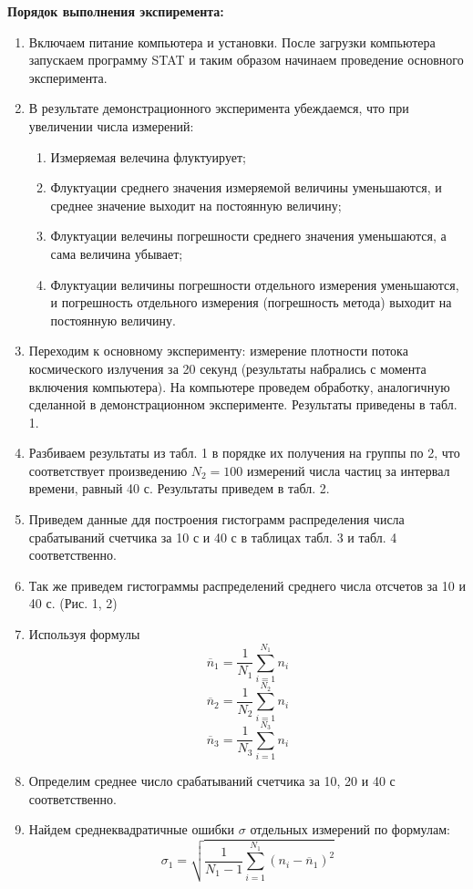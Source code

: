 \documentclass[a4paper, 12pt]{article}
\begin{document}
\textbf{Порядок выполнения экспиремента:}
\begin{enumerate}
\item Включаем питание компьютера и установки. После загрузки компьютера запускаем программу STAT и таким образом начинаем проведение основного эксперимента. 
\item В результате демонстрационного эксперимента убеждаемся, что при увеличении числа измерений:
\begin{enumerate}
\item Измеряемая велечина флуктуирует;
\item Флуктуации среднего значения измеряемой величины уменьшаются, и среднее значение выходит на постоянную величину;
\item Флуктуации велечины погрешности среднего значения уменьшаются, а сама величина убывает;
\item Флуктуации величины погрешности отдельного измерения уменьшаются, и погрешность отдельного измерения (погрешность метода) выходит на постоянную величину.
\end{enumerate}
\item Переходим к основному эксперименту: измерение плотности потока космического излучения за 20 секунд (результаты набрались с момента включения компьютера). На компьютере проведем обработку, аналогичную сделанной в демонстрационном эксперименте. Результаты приведены в табл. 1.
\item Разбиваем результаты из табл. 1 в порядке их получения на группы по 2, что соответствует произведению $N_2 = 100$ измерений числа частиц за интервал времени, равный 40 с. Результаты приведем в табл. 2.
\item Приведем данные ддя построения гистограмм распределения числа срабатываний счетчика за 10 с и 40 с в таблицах табл. 3 и табл. 4 соответственно. 
\item Так же приведем гистограммы распределений среднего числа отсчетов за 10 и 40 с. (Рис. 1, 2) 
\item Используя формулы
\[ \overline{n}_1 = \dfrac{1}{N_1} \sum_{i = 1}^{N_1} {n_i} 
 \]
 \[ \overline{n}_2 = \dfrac{1}{N_2} \sum_{i = 1}^{N_2} {n_i} 
 \]
 \[ \overline{n}_3 = \dfrac{1}{N_3} \sum_{i = 1}^{N_3} {n_i} 
 \] 
\item Определим среднее число срабатываний счетчика за 10, 20 и 40 с соответственно.
\item Найдем среднеквадратичные ошибки \textbf{$\sigma$} отдельных измерений по формулам:
\[ \sigma_1 = \sqrt{\dfrac{1}{N_1 - 1} \sum_{i = 1}^{N_1} {(n_i - \overline{n}_1)^2} }
\]
\end{enumerate}
\end{document}
